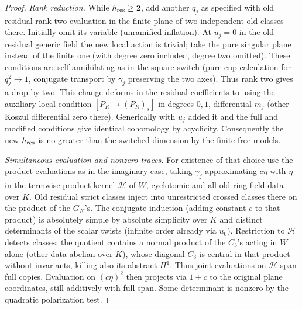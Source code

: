 \begin{proof}
\emph{Rank reduction.}
While \(h_{\rm res}\ge2\), add another \(q_j\) as specified with old residual rank-two evaluation in the finite plane of two independent old classes there. Initially omit its variable (unramified inflation). At \(u_j=0\) in the old residual generic field the new local action is trivial; take the pure singular plane instead of the finite one (with degree zero included, degree two omitted). These conditions are self-annihilating as in the square switch (pure cup calculation for \(q_j^2\to1\), conjugate transport by \(\gamma_j\) preserving the two axes). Thus rank two gives a drop by two. This change deforms in the residual coefficients to using the auxiliary local condition \([P_R\to(P_R)_s]\) in degrees \(0,1\), differential \(m_j\) (other Koszul differential zero there). Generically with \(u_j\) added it and the full and modified conditions give identical cohomology by acyclicity. Consequently the new \(h_{\rm res}\) is no greater than the switched dimension by the finite free models.

\emph{Simultaneous evaluation and nonzero traces.}
For existence of that choice use the product evaluations as in the imaginary case, taking \(\gamma_j\) approximating \(c\eta\) with \(\eta\) in the termwise product kernel \(\mathcal H\) of \(W\), cyclotomic and all old ring-field data over \(K\). Old residual strict classes inject into unrestricted crossed classes there on the product of the \(G_K\)'s. The conjugate induction (adding constant \(c\) to that product) is absolutely simple by absolute simplicity over \(K\) and distinct determinants of the scalar twists (infinite order already via \(u_0\)). Restriction to \(\mathcal H\) detects classes: the quotient contains a normal product of the \(C_3\)'s acting in \(W\) alone (other data abelian over \(K\)), whose diagonal \(C_3\) is central in that product without invariants, killing also its abstract \(H^1\). Thus joint evaluations on \(\mathcal H\) span full copies. Evaluation on \((c\eta)^2\) then projects via \(1+c\) to the original plane coordinates, still additively with full span. Some determinant is nonzero by the quadratic polarization test.


\end{proof}
